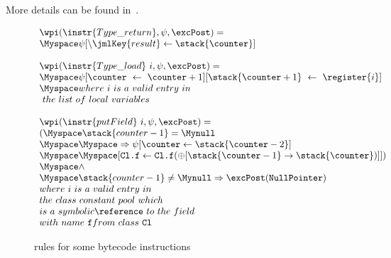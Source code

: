  More details can be found in~\cite{WPBC}.
\begin{figure}[ht]

$$
\begin{array}{l}
\wpi(\instr{Type\_return} , \psi, \excPost) =  \\
 \Myspace \psi[\backslash \jmlKey{result} \leftarrow \stack{\counter}] \\
\\
\wpi(\instr{Type\_load} \ i, \psi, \excPost) =  \\
\Myspace \psi[\counter \ \leftarrow \ \counter+1] [\stack{\counter+1} \ \leftarrow \ \register{i}] \\
 \Myspace where \ i \  is \ a \ valid \ entry \ in \\
 \ the \ list \  of \  local \ variables   \\
\\ 
\wpi(\instr{putField} \ i, \psi, \excPost) = \\
   ( \Myspace \stack{counter -1} = \Mynull \\
   \Myspace  \Myspace \Rightarrow \psi[\counter \leftarrow \stack{\counter -2} ] \\
   \Myspace  \Myspace [\texttt{Cl.f} \leftarrow \texttt{Cl.f}(\oplus [\stack{\counter - 1} \rightarrow \stack{\counter})] ] )\\
   \Myspace  \wedge  \\
   \Myspace  \stack{counter-1} \not= \Mynull \Rightarrow \excPost(\tt{NullPointer}) \\
 where \ i \  is \ a \ valid \ entry \ in \\
  the \ class \ constant \  pool \ which   \\
 is  \ a \  symbolic \reference \ to \ the \  field  \\
 with \ name \  \texttt{f} from \  class \  \texttt{Cl}
 
 \end{array} $$



\caption{rules for some bytecode instructions}
\label{instrWP}
\end{figure}

